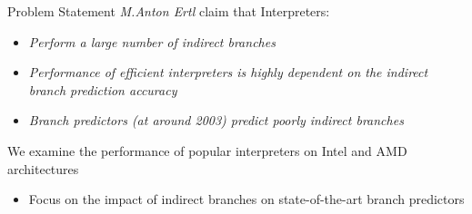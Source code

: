 \documentclass[10pt]{beamer}
\begin{document}
\begin{frame}{Problem Statement}
	\textit{M.Anton Ertl\footnotemark[1]} claim that Interpreters:
    \begin{itemize}
    	\item{\textit{Perform a large number of indirect branches}} 
        \item{\textit{Performance of efficient interpreters is highly dependent on the indirect branch prediction accuracy }} 
        \item{{\textit{Branch predictors (at around 2003) predict poorly indirect branches}}}
     \end{itemize}
     We examine the performance of popular interpreters on Intel and AMD architectures
		 \begin{itemize}
		     \item {Focus on the impact of indirect branches on state-of-the-art branch predictors }
	     \end{itemize}

\end{frame}

\end{document}

